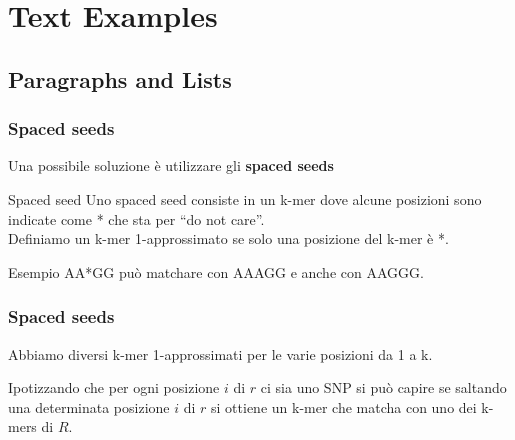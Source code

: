 \documentclass[
	11pt, %
]{beamer}
\begin{document}

\section{Text Examples} %


\subsection{Paragraphs and Lists}

\begin{frame}
	\frametitle{Spaced seeds}
	
	Una possibile soluzione è utilizzare gli \textbf{spaced seeds}
	
	\begin{block}{Spaced seed}
		Uno spaced seed consiste in un k-mer dove alcune posizioni sono indicate come * che sta per “do not care”. \\
		Definiamo un k-mer 1-approssimato se solo una posizione del k-mer è *.
	\end{block}
	
	\begin{exampleblock}{Esempio}
		 AA*GG può matchare con  AAAGG e anche con AAGGG.
	\end{exampleblock}
	

\end{frame}


\begin{frame}
	\frametitle{Spaced seeds}
	
	Abbiamo diversi k-mer 1-approssimati per le varie posizioni da 1 a k.
	
	Ipotizzando che per ogni posizione $i$ di $r$ ci sia uno SNP si può capire se saltando una determinata posizione $i$ di $r$ si ottiene un k-mer che matcha con uno dei k-mers di $R$.
	
\end{frame}
\end{document}
